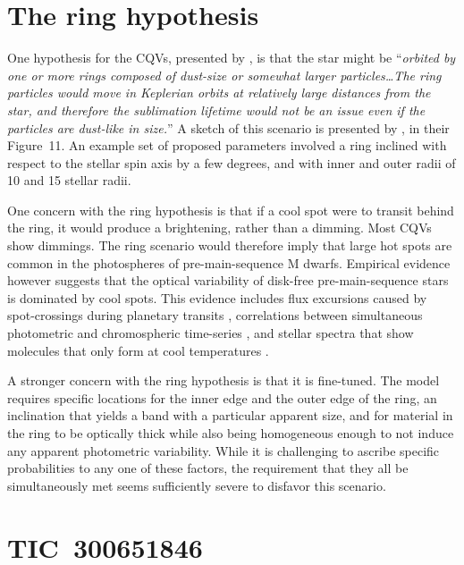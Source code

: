 \documentclass[11pt,twocolumn,tighten]{aastex63}
\begin{document}

\appendix

\section{The ring hypothesis}
\label{app:ring}

One hypothesis for the CQVs, presented by \citet{2019ApJ...876..127Z},
is that the star might be ``{\it orbited by one or more rings composed of
dust-size or somewhat larger particles\ldots The ring particles would
move in Keplerian orbits at relatively large distances from the star,
and therefore the sublimation lifetime would not be an issue even if
the particles are dust-like in size.}'' A sketch of this scenario is
presented by \citet{2019ApJ...876..127Z}, in their Figure~11.
An example set of proposed parameters involved a ring inclined with
respect to the stellar spin axis by a few degrees, and with inner and
outer radii of 10 and 15 stellar radii.

One concern with the ring hypothesis is that if a cool spot were to
transit behind the ring, it would produce a brightening, rather than a
dimming.   Most CQVs show dimmings.   The ring scenario would
therefore imply that large hot spots are common in the photospheres of
pre-main-sequence M dwarfs.  Empirical evidence however suggests that
the optical variability of disk-free pre-main-sequence stars is
dominated by cool spots.  This evidence includes flux excursions
caused by spot-crossings during planetary transits
\citep[e.g.][]{2020AJ....160...33R,2022AJ....163..147G}, correlations
between simultaneous photometric and chromospheric time-series
\citep{2019A&A...621A..21R}, and stellar spectra that show molecules
that only form at cool temperatures
\citep[e.g.][]{2017ApJ...836..200G,2023ApJ...946...10P}.

A stronger concern with the ring hypothesis is that it is fine-tuned.
The model requires specific locations for the inner edge and the outer
edge of the ring, an inclination that yields a band with a particular
apparent size, and for material in the ring to be optically thick
while also being homogeneous enough to not induce any apparent
photometric variability.
While it is challenging to ascribe specific probabilities to any one
of these factors, 
the requirement that they all be simultaneously met seems sufficiently
severe to disfavor this scenario.



\section{TIC~300651846}
\label{app:tic3006}
\end{document}
